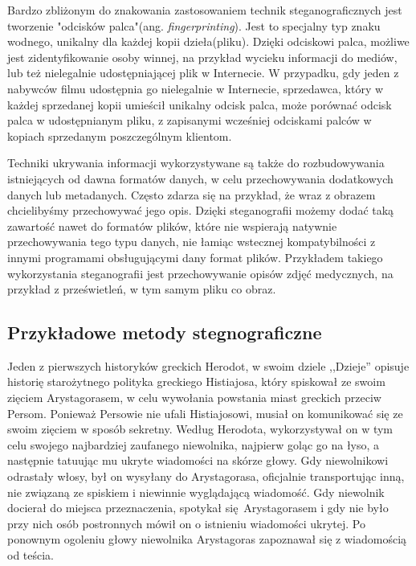 \documentclass[a4paper, twoside, 12pt]{report}
\begin{document}
        Bardzo zbliżonym do znakowania zastosowaniem technik steganograficznych jest
        tworzenie "odcisków palca"(ang. \emph{fingerprinting}). Jest to specjalny
        typ znaku wodnego, unikalny dla każdej kopii dzieła(pliku). Dzięki odciskowi
        palca, możliwe jest zidentyfikowanie osoby winnej, na przykład wycieku informacji
        do mediów, lub też nielegalnie udostępniającej plik w Internecie. W przypadku,
        gdy jeden z nabywców filmu udostępnia go nielegalnie w Internecie, sprzedawca,
        który w każdej sprzedanej kopii umieścił unikalny odcisk palca, może porównać
        odcisk palca w udostępnianym pliku, z zapisanymi wcześniej odciskami palców
        w kopiach sprzedanym poszczególnym klientom.

        Techniki ukrywania informacji wykorzystywane są także do rozbudowywania
        istniejących od dawna formatów danych, w celu przechowywania dodatkowych
        danych lub metadanych. Często zdarza się na przykład, że wraz z obrazem
        chcielibyśmy przechowywać jego opis. Dzięki steganografii możemy dodać
        taką zawartość nawet do formatów plików, które nie wspierają natywnie
        przechowywania tego typu danych, nie łamiąc wstecznej kompatybilności z innymi
        programami obsługującymi dany format plików. Przykładem takiego wykorzystania
        steganografii jest przechowywanie opisów zdjęć medycznych, na przykład
        z prześwietleń, w tym samym pliku co obraz.\cite{DISAPPEARINGCRYPTOEMBEDDINGMETDATA}

        \subsection{Przykładowe metody stegnograficzne}
        Jeden z pierwszych historyków greckich Herodot, w swoim dziele ,,Dzieje''
        opisuje historię starożytnego polityka greckiego Histiajosa, który spiskował
        ze swoim zięciem Arystagorasem, w celu wywołania powstania miast greckich
        przeciw Persom\cite{STEGANOGRAPHYINTRO}. Ponieważ Persowie nie ufali Histiajosowi, musiał on komunikować
        się ze swoim zięciem w sposób sekretny. Według Herodota, wykorzystywał
        on w tym celu swojego najbardziej zaufanego niewolnika, najpierw goląc
        go na łyso, a następnie tatuując mu ukryte wiadomości na skórze głowy.
        Gdy niewolnikowi odrastały włosy, był on wysyłany do Arystagorasa, oficjalnie
        transportując inną, nie związaną ze spiskiem i niewinnie wyglądającą wiadomość.
        Gdy niewolnik docierał do miejsca przeznaczenia, spotykał się Arystagorasem i
        gdy nie było przy nich osób postronnych mówił on o istnieniu wiadomości ukrytej.
        Po ponownym ogoleniu głowy niewolnika Arystagoras zapoznawał się z wiadomością
        od teścia.
\end{document}
